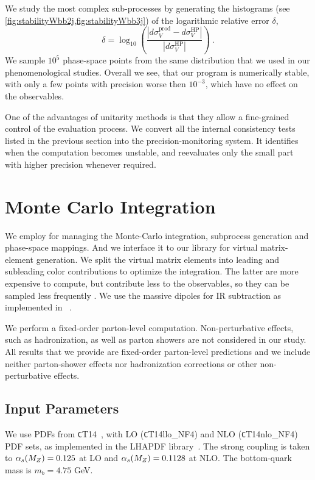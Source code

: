 We study the most complex sub-processes
by generating the histograms (see \cref{fig:stabilityWbb2j,fig:stabilityWbb3j}) of the logarithmic relative error $\delta$,
\begin{equation}
  \delta = \log_{10}\left(\frac{\left|d\sigma^{\text{prod}}_V - d\sigma^{\text{HP}}_V\right|}{\left|d\sigma^{\text{HP}}_V\right|}\right)\ .
  \label{reldiff}
\end{equation}
We sample $10^5$ phase-space points from the same distribution that we used in our phenomenological studies.
Overall we see, that our program is numerically stable,
with only a few points with precision worse then $10^{-3}$,
which have no effect on the observables.

One of the advantages of unitarity methods is that they allow a fine-grained control of the evaluation process.
We convert all the internal consistency tests listed in the previous section into
the precision-monitoring system.  
It identifies when the computation becomes unstable, and reevaluates
only the small part with higher precision whenever required.



\section{Monte Carlo Integration}
\label{sec:wbb:mc_integration}



We employ \SHERPA{} \cite{Sherpa} for managing the Monte-Carlo integration,
subprocess generation and phase-space mappings.
And we interface it to our library for virtual matrix-element generation.
We split the virtual matrix elements into leading and subleading color contributions
to optimize the integration. The latter are more expensive to compute, but contribute less to the observables,
so they can be sampled less frequently \cite{BH:W3jDistributions,Ita:2011ar}.
We use the massive dipoles \cite{Catani2002} for IR subtraction as implemented in \COMIX{}~\cite{Comix}.
%

We perform a fixed-order parton-level computation. Non-perturbative effects, such as hadronization, as well as parton showers are not considered in our study.
All results that we provide are fixed-order parton-level predictions and we include neither parton-shower effects nor hadronization corrections or other
non-perturbative effects.

\subsection{Input Parameters}
\label{sec:base_setup}
We use PDFs from {\texttt CT14}~\cite{CT14},
with LO ({\texttt CT14llo\_NF4}) and NLO ({\texttt CT14nlo\_NF4}) PDF sets, as
implemented in the LHAPDF library~\cite{LHAPDF}. 
The strong coupling is taken to $\alpha_s(M_Z)=0.125$ at LO and
$\alpha_s(M_Z)=0.1128$ at NLO. 
The bottom-quark mass is $m_b=4.75$ GeV.

